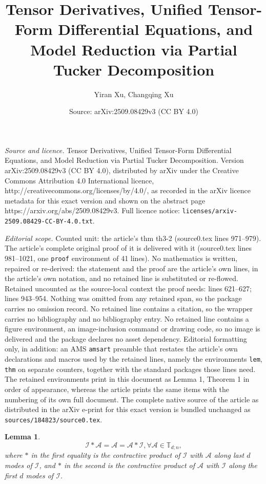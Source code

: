\documentclass[10pt,a4paper]{amsart}
\title{Tensor Derivatives, Unified Tensor-Form Differential Equations, and Model Reduction via Partial Tucker Decomposition}
\author{Yiran Xu, Changqing Xu}
\date{Source: arXiv:2509.08429v3 (CC BY 4.0)}
\newtheorem{lem}{Lemma}
\newcommand{\A}{\mathcal{A}}
\newcommand{\TT}{\mathbb{T}}
\newcommand{\beq}{\begin{equation}}
\newcommand{\caI}{\mathcal{I}}
\newcommand{\eeq}{\end{equation}}
\begin{document}
\maketitle

\noindent\emph{Source and licence.} Tensor Derivatives, Unified Tensor-Form Differential Equations, and Model Reduction via Partial Tucker Decomposition. Version arXiv:2509.08429v3 (CC BY 4.0), distributed by arXiv under the Creative Commons Attribution 4.0 International licence, http://creativecommons.org/licenses/by/4.0/, as recorded in the arXiv licence metadata for this exact version and shown on the abstract page https://arxiv.org/abs/2509.08429v3. Full licence notice: \texttt{licenses/arxiv-2509.08429-CC-BY-4.0.txt}.\par\smallskip

\noindent\textit{Editorial scope.} Counted unit: the article's thm th3-2 (source0.tex lines 971--979). The article's complete original proof of it is delivered with it (source0.tex lines 981--1021, one \texttt{proof} environment of 41 lines). No mathematics is written, repaired or re-derived: the statement and the proof are the article's own lines, in the article's own notation, and no retained line is substituted or re-flowed.  Retained uncounted as the source-local context the proof needs: lines 621--627; lines 943--954.  Nothing was omitted from any retained span, so the package carries no omission record.  No retained line contains a citation, so the wrapper carries no bibliography and no bibliography entry.  No retained line contains a figure environment, an image-inclusion command or drawing code, so no image is delivered and the package declares no asset dependency.  Editorial formatting only, in addition: an AMS \texttt{amsart} preamble that restates the article's own declarations and macros used by the retained lines, namely the environments \texttt{lem}, \texttt{thm} on separate counters, together with the standard packages those lines need.  The retained environments print in this document as Lemma 1, Theorem 1 in order of appearance, whereas the article prints the same items with the numbering of its own full document.  The complete native source of the article as distributed in the arXiv e-print for this exact version is bundled unchanged as \texttt{sources/184823/source0.tex}.
\begin{lem}\label{le2-2}
\beq\label{eq:le2-2-1} 
\caI\ast \A = \A = \A\ast \caI, \forall  \A\in\TT_{d;n},
\eeq
where $\ast$ in the first equality is the contractive product of $\caI$ with $\A$ along last $d$ modes of $\caI$, and $\ast$ in the second is the 
contractive product of $\A$ with $\caI$ along the first $d$ modes of $\caI$. 
\end{lem}
\end{document}
